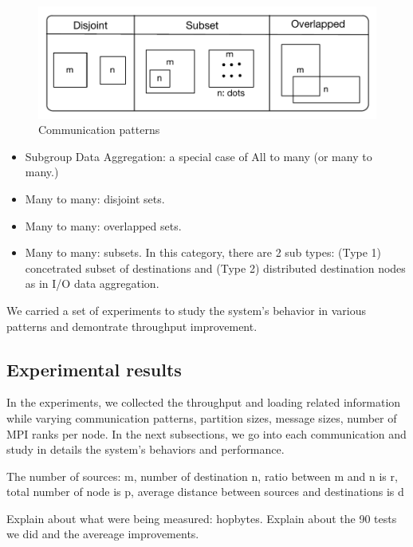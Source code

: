 \begin{figure}[ht]
\vspace{-0.1in}
\centering
\includegraphics[scale=0.55]{figures/patterns.pdf}
\vspace{-0.1in}
\caption{Communication patterns}
\vspace{-0.1in}
\label{fig:patterns}
\end{figure}

\begin{itemize}
\item Subgroup Data Aggregation: a special case of All to many (or many to many.)
\item Many to many: disjoint sets.
\item Many to many: overlapped sets.
\item Many to many: subsets. In this category, there are 2 sub types: (Type 1) concetrated subset of destinations and (Type 2) distributed destination nodes as in I/O data aggregation.
\end{itemize}

We carried a set of experiments to study the system's behavior in various patterns and demontrate throughput improvement.

\subsection{Experimental results}

In the experiments, we collected the throughput and loading related information while varying communication patterns, partition sizes, message sizes, number of MPI ranks per node.
In the next subsections, we go into each communication and study in details the system's behaviors and performance.

The number of sources: m, number of destination n, ratio between m and n is r, total number of node is p, average distance between sources and destinations is d

Explain about what were being measured: hopbytes. Explain about the 90 tests we did and the avereage improvements.

